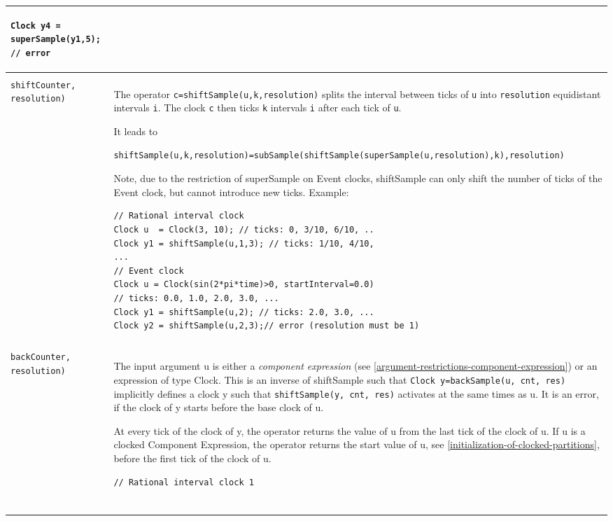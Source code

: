 \begin{longtable}[]{|p{4cm}|p{11cm}|}
\begin{example*}
\begin{lstlisting}[language=modelica]
Clock y4 = superSample(y1,5); // error
\end{lstlisting}
\end{example*}
\\ \hline
\begin{tabular}{@{}p{4cm}@{}}
\lstinline!shiftSample(u!,\\
\lstinline!shiftCounter, resolution)!
\end{tabular}
& The operator \lstinline!c=shiftSample(u,k,resolution)! splits the interval between
ticks of \lstinline!u! into \lstinline!resolution! equidistant intervals \lstinline!i!.
The clock \lstinline!c! then ticks \lstinline!k! intervals \lstinline!i! after each tick of \lstinline!u!.

It leads to
\begin{lstlisting}[language=modelica]
shiftSample(u,k,resolution)=subSample(shiftSample(superSample(u,resolution),k),resolution)
\end{lstlisting}
\par
\begin{nonnormative*}
Note, due to the restriction of superSample on Event clocks, shiftSample can only shift the number of ticks of the Event clock, but cannot introduce new ticks. Example:
\begin{lstlisting}[language=modelica]
// Rational interval clock
Clock u  = Clock(3, 10); // ticks: 0, 3/10, 6/10, ..
Clock y1 = shiftSample(u,1,3); // ticks: 1/10, 4/10,
...
// Event clock
Clock u = Clock(sin(2*pi*time)>0, startInterval=0.0)
// ticks: 0.0, 1.0, 2.0, 3.0, ...
Clock y1 = shiftSample(u,2); // ticks: 2.0, 3.0, ...
Clock y2 = shiftSample(u,2,3);// error (resolution must be 1)
\end{lstlisting}
\end{nonnormative*}
\\ \hline
\begin{tabular}{@{}p{4cm}@{}}
\lstinline!backSample(u,!\\
\lstinline!backCounter, resolution)!
\end{tabular}
&
The input argument u is either a \emph{component expression} (see
\cref{argument-restrictions-component-expression}) or an expression of type Clock.
This is an inverse of shiftSample such that \lstinline!Clock y=backSample(u, cnt, res)! implicitly defines
a clock y such that \lstinline!shiftSample(y, cnt, res)! activates at the same times as u.
It is an
error, if the clock of y starts before the base clock of u.

At every
tick of the clock of y, the operator returns the value of u from the
last tick of the clock of u. If u is a clocked Component Expression, the
operator returns the start value of u, see \cref{initialization-of-clocked-partitions}, before the
first tick of the clock of u.
\par
\begin{example*}
\begin{lstlisting}[language=modelica]
// Rational interval clock 1


\end{lstlisting}
\end{example*}
\end{longtable}
